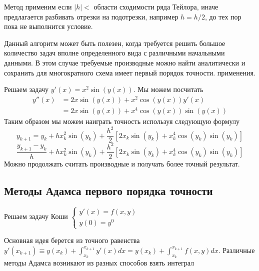 Метод применим если $|h|<$ области сходимости ряда Тейлора,
иначе предлагается разбивать отрезки на подотрезки, например $h=h/2$,
до тех пор пока не выполнится условие.

\begin{remark}
  Данный алгоритм может быть полезен, когда требуется решить
  большое количество задач вполне определенного вида с
  различными начальными данными. В этом случае требуемые
  производные можно найти аналитически и сохранить для многократного                                                                                                                   схема имеет первый порядок точности.
  применения.
\end{remark}

\begin{example}
  Решаем задачу $y'(x)=x^2\sin(y(x))$. Мы можем посчитать
  \begin{align*}
    y''(x) & = 2x\sin(y(x))+x^2\cos(y(x))y'(x)      \\
           & = 2x\sin(y(x))+x^4\cos(y(x))\sin(y(x))
  \end{align*}
  Таким образом мы можем наиграть точность используя следующую формулу
  \[y_{k+1}=y_k+hx_k^2\sin(y_{k})+\frac{h^2}{2}[2x_k\sin(y_k)+x_k^4\cos(y_k)\sin(y_k)]\]
  \[\frac{y_{k+1}-y_k}{h}+hx_k^2\sin(y_{k})+\frac{h^2}{2}[2x_k\sin(y_k)+x_k^4\cos(y_k)\sin(y_k)]\]
  Можно продолжать считать производные и получать более точный результат.
\end{example}

\subsection*{Методы Адамса первого порядка точности}

Решаем задачу Коши $\begin{cases}
    y'(x)=f(x,y) \\ y(0)=y^0
  \end{cases}$

Основная идея берется из точного равенства $y'(x_{k+1})\equiv y(x_k)+\int_{x_k}^{x_{k+1}}y'(x)dx=y(x_k)+\int_{x_k}^{x_{k+1}}f(x,y)dx$.
Различные методы Адамса возникают из разных способов взять интеграл

